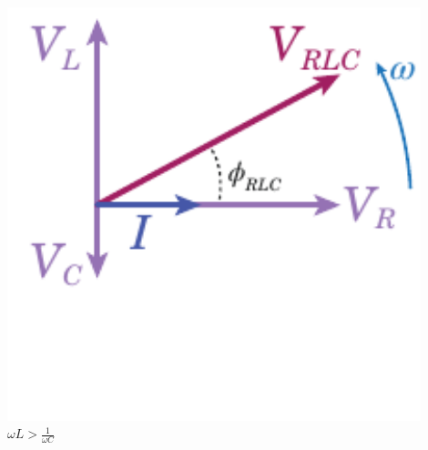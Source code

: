 \begin{minipage}{0.33\textwidth}
	\begin{center}
		\includegraphics[width=0.9\textwidth]{images/chp11/chp11fasoriRLC1.pdf}
		$\omega L>\frac{1}{\omega C}$
	\end{center}
\end{minipage}

